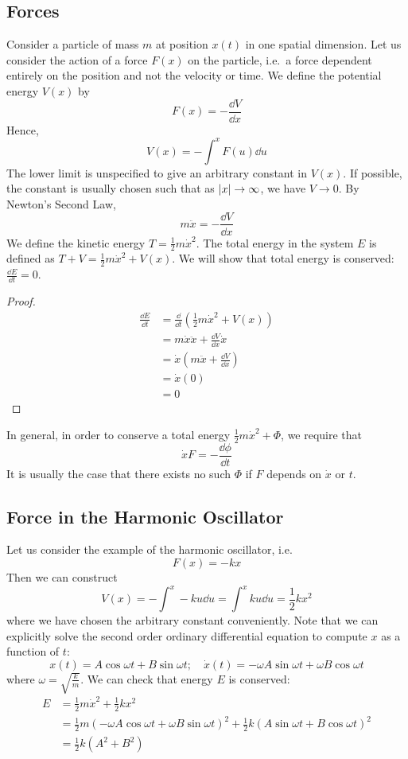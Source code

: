 \subsection{Forces}
Consider a particle of mass \(m\) at position \(x(t)\) in one spatial dimension.
Let us consider the action of a force \(F(x)\) on the particle, i.e.\ a force dependent entirely on the position and not the velocity or time.
We define the potential energy \(V(x)\) by
\[
	F(x) = -\frac{\dd{V}}{\dd{x}}
\]
Hence,
\[
	V(x) = - \int^x F(u) \dd{u}
\]
The lower limit is unspecified to give an arbitrary constant in \(V(x)\).
If possible, the constant is usually chosen such that as \(\abs{x} \to \infty\), we have \(V \to 0\).
By Newton's Second Law,
\[
	m\ddot{x} = -\frac{\dd{V}}{\dd{x}}
\]
We define the kinetic energy \(T = \frac{1}{2}m\dot x^2\).
The total energy in the system \(E\) is defined as \(T + V = \frac{1}{2} m \dot x^2 + V(x)\).
We will show that total energy is conserved: \(\frac{\dd{E}}{\dd{t}} = 0\).
\begin{proof}
	\begin{align*}
		\frac{\dd{E}}{\dd{t}} & = \frac{\dd}{\dd{t}}\left( \frac{1}{2}m\dot x^2 + V(x) \right) \\
		                      & = m\dot x \ddot x + \frac{\dd{V}}{\dd{x}} \dot x               \\
		                      & = \dot x\left( m \ddot x + \frac{\dd{V}}{\dd{x}} \right)       \\
		                      & = \dot x ( 0 )                                                 \\
		                      & = 0
	\end{align*}
\end{proof}
\noindent In general, in order to conserve a total energy \(\frac{1}{2}m\dot x^2 + \Phi\), we require that
\[
	\dot x F = -\frac{\dd{\phi}}{\dd{t}}
\]
It is usually the case that there exists no such \(\Phi\) if \(F\) depends on \(\dot x\) or \(t\).

\subsection{Force in the Harmonic Oscillator}
Let us consider the example of the harmonic oscillator, i.e.
\[
	F(x) = -kx
\]
Then we can construct
\[
	V(x) = -\int^x -ku \dd{u} = \int^x ku \dd{u} = \frac{1}{2} kx^2
\]
where we have chosen the arbitrary constant conveniently.
Note that we can explicitly solve the second order ordinary differential equation to compute \(x\) as a function of \(t\):
\[
	x(t) = A\cos \omega t + B\sin \omega t;\quad \dot x(t) = -\omega A \sin \omega t + \omega B \cos \omega t
\]
where \(\omega = \sqrt{\frac{k}{m}}\).
We can check that energy \(E\) is conserved:
\begin{align*}
	E & = \frac{1}{2}m\dot x^2 + \frac{1}{2}kx^2                                                                                                         \\
	  & = \frac{1}{2}m \left( -\omega A \cos \omega t + \omega B \sin \omega t \right)^2 + \frac{1}{2}k \left( A\sin \omega t + B\cos \omega t \right)^2 \\
	  & = \frac{1}{2}k(A^2 + B^2)
\end{align*}

